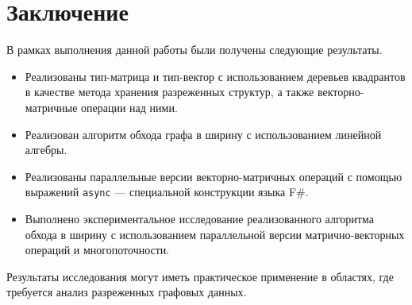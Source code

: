 
\section*{Заключение}

В рамках выполнения данной работы были получены следующие результаты.

\begin{itemize}
\item Реализованы тип-матрица и тип-вектор с использованием деревьев квадрантов в качестве метода хранения разреженных структур, а также векторно-матричные операции над ними.
\item Реализован алгоритм обхода графа в ширину с использованием линейной алгебры.
\item Реализованы параллельные версии векторно-матричных операций с помощью выражений \texttt{async} --- специальной конструкции языка F\#.
\item Выполнено экспериментальное исследование реализованного алгоритма обхода в ширину с использованием параллельной версии матрично-векторных операций и многопоточности.
\end{itemize}

Результаты исследования могут иметь практическое применение в областях, где требуется анализ разреженных графовых данных. 